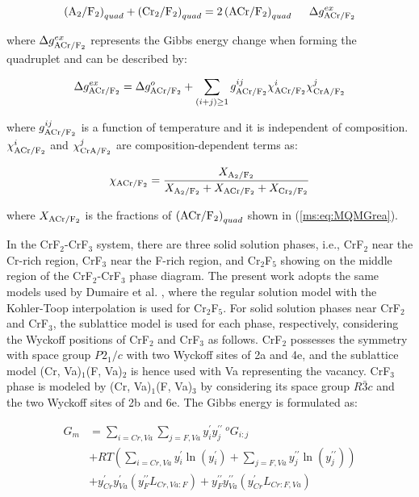 \begin{equation} \label{ms:eq:MQMGrea}
    \left(\rm {A_2/F_2}\right)_{quad}+\left({\rm Cr_2/F_2}\right)_{quad}=2\left({\rm ACr/F_2}\right)_{quad}\;\;\;\;\;\Delta g_{\rm ACr/F_2}^{ex}
\end{equation}

where $\Delta g_{\rm ACr/F_2}^{ex}$ represents the Gibbs energy change when forming the quadruplet and can be described by:

\begin{equation} \label{ms:eq:MQMGex}
    \Delta g_{\rm {ACr/F_2}}^{ex}=\Delta g_{\rm {ACr/F_2}}^o+\sum_{(i+j)\geq1} g_{\rm {ACr/F_2}}^{ij}\chi _{\rm {ACr/F_2}}^{i}\chi _{\rm {CrA/F_2}}^{j}
\end{equation}

where $g_{\rm {ACr/F_2}}^{ij}$ is a function of temperature and it is independent of composition. $\chi _{\rm {ACr/F_2}}^{i}$ and $\chi _{\rm {CrA/F_2}}^{j}$ are composition-dependent terms as:

\begin{equation} \label{ms:eq:chi}
    \chi_{\rm {ACr/F_2}} = \dfrac{X_{\rm {A_2/F_2}}}{X_{\rm {A_2/F_2}}+X_{\rm {ACr/F_2}}+X_{\rm {Cr_2/F_2}}}
\end{equation}

where $X_{\rm{ACr/F_2}}$ is the fractions of $\left(\rm{ACr/F_2}\right)_{quad}$ shown in (\ref{ms:eq:MQMGrea}). 

In the CrF${_2}$-CrF${_3}$ system, there are three solid solution phases, i.e., CrF${_2}$ near the Cr-rich region, CrF${_3}$ near the F-rich region, and Cr$_2$F$_5$ showing on the middle region of the CrF${_2}$-CrF${_3}$ phase diagram. The present work adopts the same models used by Dumaire et al. \cite{dumaire2021thermodynamic}, where the regular solution model with the Kohler-Toop interpolation \cite{kohler1960estimation, toop1965predicting, chartrand2000choice, pelton2001general} is used for Cr$_2$F$_5$. For solid solution phases near CrF${_2}$ and CrF${_3}$, the sublattice model is used for each phase, respectively, considering the Wyckoff positions of CrF${_2}$ and CrF${_3}$ as follows. CrF${_2}$ possesses the symmetry with space group $P2_1/c$ with two Wyckoff sites of 2a and 4e, and the sublattice model (Cr, Va)$_1$(F, Va)$_2$ is hence used with Va representing the vacancy. CrF${_3}$ phase is modeled by (Cr, Va)$_1$(F, Va)$_3$ by considering its space group $R\bar{3}c$ and the two Wyckoff sites of 2b and 6e. The Gibbs energy is formulated as:

\begin{equation} \label{ms:eq:Crssoln}
    \begin{aligned}
        G_m&=\sum_{i=Cr,Va}{\sum_{j=F,Va}{y_i^\prime y_j^{\prime\prime}}\:^oG_{i:j}}\\
        &+RT\left(\sum_{i=Cr,Va}{y_i^\prime\ln{\left(y_i^\prime\right)}}+\sum_{j=F,Va}{y_j^{\prime\prime}\ln{\left(y_j^{\prime\prime}\right)}}\right)\\&+y_{Cr}^\prime y_{Va}^\prime\left(y_F^{\prime\prime}L_{Cr,Va:F}\right)+y_F^{\prime\prime}y_{Va}^{\prime\prime}\left(y_{Cr}^\prime L_{Cr:F,Va}\right)
    \end{aligned}
\end{equation}

